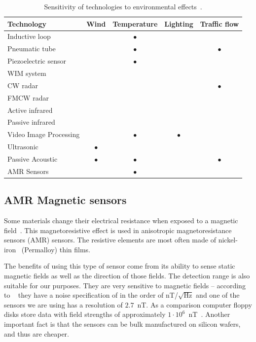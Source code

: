 \begin{table}[!p]
\centering
\caption[Sensitivity of technologies to environmental effects]{Sensitivity of technologies to environmental effects~\cite{path2007}.}
\begin{tabular}{lcccc}\toprule
 \textbf{Technology} 	& \textbf{Wind} & \textbf{Temperature} & \textbf{Lighting} & \textbf{Traffic flow}\\\midrule
 Inductive loop		& 		& $\bullet$	& 		&	\\
 Pneumatic tube		& 		& $\bullet$	&		& $\bullet$	\\
 Piezoelectric sensor	& 		& $\bullet$	&		&	\\
 WIM system		& 		& 		& 		& 	\\
 CW radar		& 		& 		& 		& $\bullet$ 	\\
 FMCW radar		& 		& 		& 		& 	\\
 Active infrared	& 		&		&		& 	\\
 Passive infrared	& 		& 		& 		& 	\\
 Video Image Processing & 		& $\bullet$	& $\bullet$	& 	\\
 Ultrasonic		& $\bullet$	&		&		& 	\\
 Passive Acoustic	& $\bullet$	& $\bullet$	& 		& $\bullet$	\\
 AMR Sensors		& 		& $\bullet$	& 		& 	\\ \bottomrule
\end{tabular} 
\label{tbl:enviromentaleffects}
\end{table} 


\subsection{AMR Magnetic sensors}

Some materials change their electrical resistance when exposed to a magnetic field~\cite{imego2006}. This magnetoresistive effect is used in anisotropic magnetoresistance sensors (AMR) sensors. The resistive elements are most often made of nickel-iron~\cite{caruso1998} (Permalloy) thin films.

The benefits of using this type of sensor come from its ability to sense static magnetic fields as well as the direction of those fields. The detection range is also suitable for our purposes. They are very sensitive to magnetic fields -- according to ~\cite{imego2006} they have a noise specification of in the order of  nT/$\sqrt{\text{Hz}}$ and one of the sensors we are using has a resolution of $2.7$~nT. As a comparison computer floppy disks store data with field strengths of approximately $1\cdot{}10^6$~nT~\cite{hmc2300}. Another important fact is that the sensors can be bulk manufactured on silicon wafers, and thus are cheaper.

